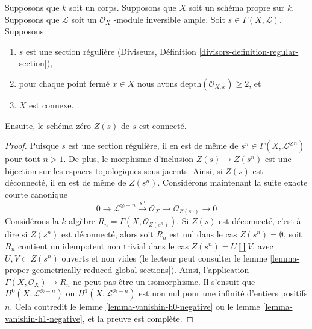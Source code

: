 \begin{lemma}
\label{lemma-connectedness-ample-divisor}
Supposons que $k$ soit un corps. Supposons que $X$ soit un schéma
propre sur $k$. Supposons que $\mathcal{L}$ soit un $\mathcal{O}_X$
-module inversible ample. Soit $s \in \Gamma(X, \mathcal{L})$. Supposons
\begin{enumerate}
\item $s$ est une section régulière
(Diviseurs, Définition
\ref{divisors-definition-regular-section}), \item pour
chaque point fermé $x \in X$ nous avons
$\text{depth}(\mathcal{O}_{X, x}) \geq 2$, et \item $X$ est connexe.
\end{enumerate}
Ensuite, le schéma zéro $Z(s)$ de $s$ est connecté.
\end{lemma}

\begin{proof}
Puisque $s$ est une section régulière, il en est de même de $s^n \in
\Gamma(X, \mathcal{L}^{\otimes n})$ pour tout $n > 1$. De plus, le
morphisme d'inclusion $Z(s) \to Z(s^n)$ est une bijection sur les espaces
topologiques sous-jacents. Ainsi, si $Z(s)$ est déconnecté, il en est de
même de $Z(s^n)$. Considérons maintenant la suite exacte courte canonique
$$
0 \to \mathcal{L}^{\otimes -n} \xrightarrow{s^n}
\mathcal{O}_X \to \mathcal{O}_{Z(s^n)} \to 0
$$
Considérons la $k$-algèbre $R_n = \Gamma(X,
\mathcal{O}_{Z(s^n)})$. Si $Z(s)$ est déconnecté, c'est-à-dire si
$Z(s^n)$ est déconnecté, alors soit $R_n$ est nul dans le cas
$Z(s^n) = \emptyset$, soit $R_n$ contient un idempotent non trivial
dans le cas $Z(s^n) = U \amalg V$, avec $U, V \subset Z(s^n)$
ouverts et non vides (le lecteur peut consulter le lemme
\ref{lemma-proper-geometrically-reduced-global-sections}). Ainsi,
l'application $\Gamma(X, \mathcal{O}_X) \to R_n$ ne peut pas être un
isomorphisme. Il s'ensuit que $H^0(X, \mathcal{L}^{\otimes -n})$ ou
$H^1(X, \mathcal{L}^{\otimes -n})$ est non nul pour une infinité
d'entiers positifs $n$. Cela contredit le lemme
\ref{lemma-vanishin-h0-negative} ou le lemme \ref{lemma-vanishin-h1-negative}, et la preuve est complète.
\end{proof}














